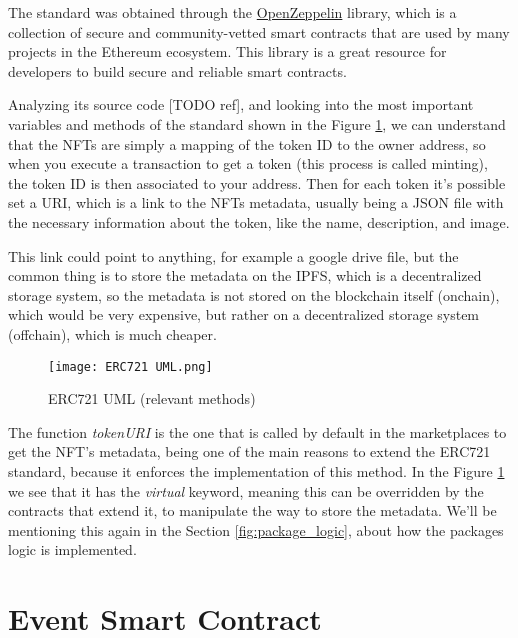 The standard was obtained through the
\href{https://docs.openzeppelin.com/contracts/api/token/erc721#ERC721}{OpenZeppelin}
library, which is a collection of secure and community-vetted smart contracts
that are used by many projects in the Ethereum ecosystem. This library is a
great resource for developers to build secure and reliable smart contracts.

Analyzing its source code [TODO ref], and looking into the most important
variables and methods of the standard shown in the Figure \ref{fig:erc721_uml},
we can understand that the NFTs are simply a mapping of the token ID to the
owner address, so when you execute a transaction to get a token (this process
is called minting), the token ID is then associated to your address. Then for
each token it's possible set a URI, which is a link to the NFTs metadata,
usually being a JSON file with the necessary information about the token, like
the name, description, and image.

This link could point to anything, for example a google drive file, but the
common thing is to store the metadata on the IPFS, which is a decentralized
storage system, so the metadata is not stored on the blockchain itself
(onchain), which would be very expensive, but rather on a decentralized storage
system (offchain), which is much cheaper.

\begin{figure}[H]
	\texttt{[image: ERC721 UML.png]}
	\centering
	\caption{ERC721 UML (relevant methods)}
	\label{fig:erc721_uml}
\end{figure}

The function \textit{tokenURI} is the one that is called by default in the
marketplaces to get the NFT's metadata, being one of the main reasons to extend
the ERC721 standard, because it enforces the implementation of this method. In
the Figure \ref{fig:erc721_uml} we see that it has the \textit{virtual}
keyword, meaning this can be overridden by the contracts that extend it, to
manipulate the way to store the metadata. We'll be mentioning this again in the
Section \ref{fig:package_logic}, about how the packages logic is implemented.

\section{Event Smart Contract}
\label{subsec:event_smart_contract}

